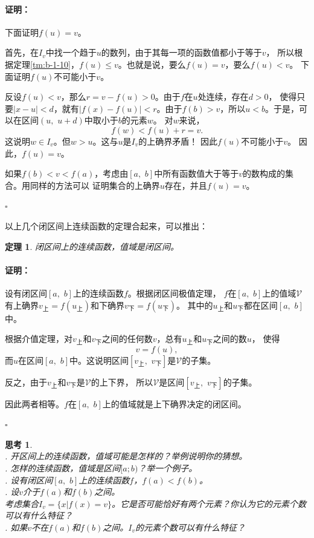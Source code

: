\documentclass[12pt,UTF8]{ctexbook}
\newtheorem{tm}{定理}[section]
\newtheorem{sk}{思考}[section]
\renewenvironment{proof}{\paragraph{\textbf{证明：}}}{\hfill$\square$}
\begin{document}
\begin{appendix}
\begin{proof}
    下面证明$f(u) = v$。

    首先，在$I_v$中找一个趋于$u$的数列，由于其每一项的函数值都小于等于$v$，
    所以根据定理\ref{tm:b-1-10}，$f(u)\leqslant v$。也就是说，要么$f(u) = v$，要么$f(u) < v$。
    下面证明$f(u)$不可能小于$v$。

    反设$f(u)< v$，那么$r = v - f(u) > 0$。由于$f$在$u$处连续，存在$d>0$，
    使得只要$|x - u| < d$，就有$|f(x) - f(u)| < r$。由于$f(b) > v$，所以$u < b$。于是，可以在区间$(u, \,\, u+d)$中取小于$b$的元素$w$。
    对$w$来说，
    $$ f(w) < f(u) + r = v.$$
    这说明$w\in I_v$。但$w>u$。这与$u$是$I_v$的上确界矛盾！
    因此$f(u)$不可能小于$v$。
    因此，$f(u) = v$。

    如果$f(b) < v < f(a)$，考虑由$[a, \,\,b]$中所有函数值大于等于$v$的数构成的集合。用同样的方法可以
    证明集合的上确界$u$存在，并且$f(u) = v$。

\end{proof}

以上几个闭区间上连续函数的定理合起来，可以推出：
\begin{tm}
    闭区间上的连续函数，值域是闭区间。
\end{tm}
\begin{proof}
    设有闭区间$[a,\,\,b]$上的连续函数$f$。根据闭区间极值定理，
    $f$在$[a,\,\,b]$上的值域$\mathcal{V}$有上确界$v_{\text{上}} = f(u_{\text{上}})$和下确界$v_{\text{下}} = f(u_{\text{下}})$。
    其中的$u_{\text{上}}$和$u_{\text{下}}$都在区间$[a,\,\,b]$中。

    根据介值定理，对$v_{\text{上}}$和$v_{\text{下}}$之间的任何数$v$，总有$u_{\text{上}}$和$u_{\text{下}}$之间的数$u$，
    使得
    $$ v = f(u),$$
    而$u$在区间$[a,\,\,b]$中。这说明区间$[v_{\text{上}},\,\,v_{\text{下}}]$是$\mathcal{V}$的子集。

    反之，由于$v_{\text{上}}$和$v_{\text{下}}$是$\mathcal{V}$的上下界，
    所以$\mathcal{V}$是区间$[v_{\text{上}},\,\,v_{\text{下}}]$的子集。

    因此两者相等。$f$在$[a,\,\,b]$上的值域就是上下确界决定的闭区间。

\end{proof}

\begin{sk}
    \mbox{} \\
    . 开区间上的连续函数，值域可能是怎样的？举例说明你的猜想。\\
    . 怎样的连续函数，值域是区间$[a; b)$？举一个例子。\\
    . 设有闭区间$[a,\,\,b]$上的连续函数$f$，$f(a) < f(b)$。\\
    . 设$v$介于$f(a)$和$f(b)$之间。\\
    考虑集合$I_v = \{x | f(x) = v\}$。它是否可能恰好有两个元素？你认为它的元素个数可以有什么特征？\\
    . 如果$v$不在$f(a)$和$f(b)$之间。$I_v$的元素个数可以有什么特征？
\end{sk}


\end{appendix}
\end{document}
